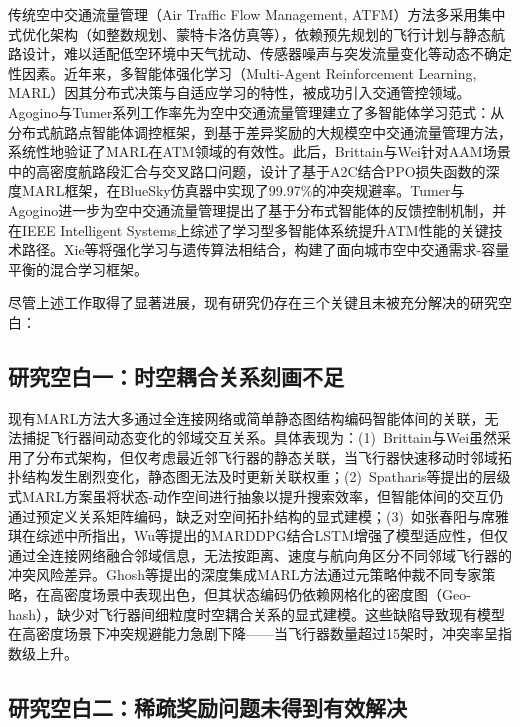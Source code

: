 \documentclass[12pt,a4paper,UTF8]{ctexart}
\begin{document}
传统空中交通流量管理（Air Traffic Flow Management, ATFM）方法多采用集中式优化架构（如整数规划、蒙特卡洛仿真等），依赖预先规划的飞行计划与静态航路设计，难以适配低空环境中天气扰动、传感器噪声与突发流量变化等动态不确定性因素。近年来，多智能体强化学习（Multi-Agent Reinforcement Learning, MARL）因其分布式决策与自适应学习的特性，被成功引入交通管控领域。Agogino与Tumer系列工作率先为空中交通流量管理建立了多智能体学习范式：从分布式航路点智能体调控框架\cite{ref1}，到基于差异奖励的大规模空中交通流量管理方法\cite{ref2}，系统性地验证了MARL在ATM领域的有效性。此后，Brittain与Wei针对AAM场景中的高密度航路段汇合与交叉路口问题，设计了基于A2C结合PPO损失函数的深度MARL框架，在BlueSky仿真器中实现了99.97\%的冲突规避率\cite{ref3}。Tumer与Agogino进一步为空中交通流量管理提出了基于分布式智能体的反馈控制机制\cite{ref4}，并在IEEE Intelligent Systems上综述了学习型多智能体系统提升ATM性能的关键技术路径\cite{ref5}。Xie等将强化学习与遗传算法相结合，构建了面向城市空中交通需求-容量平衡的混合学习框架\cite{ref6}。

尽管上述工作取得了显著进展，现有研究仍存在三个关键且未被充分解决的研究空白：

\subsection{研究空白一：时空耦合关系刻画不足}

现有MARL方法大多通过全连接网络或简单静态图结构编码智能体间的关联，无法捕捉飞行器间动态变化的邻域交互关系。具体表现为：(1)~Brittain与Wei虽然采用了分布式架构，但仅考虑最近邻飞行器的静态关联，当飞行器快速移动时邻域拓扑结构发生剧烈变化，静态图无法及时更新关联权重\cite{ref3}；(2)~Spatharis等提出的层级式MARL方案虽将状态-动作空间进行抽象以提升搜索效率，但智能体间的交互仍通过预定义关系矩阵编码，缺乏对空间拓扑结构的显式建模\cite{ref7}；(3)~如张春阳与席雅琪在综述中所指出\cite{ref8}，Wu等提出的MARDDPG结合LSTM增强了模型适应性，但仅通过全连接网络融合邻域信息，无法按距离、速度与航向角区分不同邻域飞行器的冲突风险差异。Ghosh等提出的深度集成MARL方法通过元策略仲裁不同专家策略，在高密度场景中表现出色，但其状态编码仍依赖网格化的密度图（Geo-hash），缺少对飞行器间细粒度时空耦合关系的显式建模\cite{ref9}。这些缺陷导致现有模型在高密度场景下冲突规避能力急剧下降——当飞行器数量超过15架时，冲突率呈指数级上升。

\subsection{研究空白二：稀疏奖励问题未得到有效解决}
\end{document}
